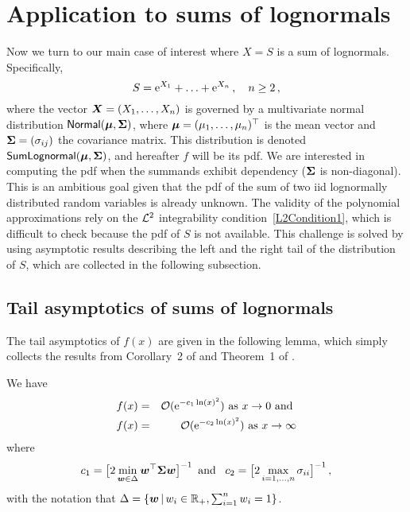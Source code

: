 \section{Application to sums of lognormals} \label{S:LN_Appl}
Now we turn to our main case of interest where $X=S$ is a sum of lognormals. Specifically,
\begin{equation}\label{7.12a}
S=\mathrm{e}^{X_1}+\ldots+\mathrm{e}^{X_n} \,,\quad n \ge 2\,,
\end{equation}
where the vector $\bm{X}=(X_1,\ldots,X_n)$ is governed by a multivariate normal distribution $\mathsf{Normal}(\bm{\mu}, \bm{\Sigma})$, where $\bm{\mu}=(\mu_{1},\ldots,\mu_{n})^\top$ is the mean vector and $\bm{\Sigma}=(\sigma_{ij})$ the covariance matrix.
This distribution is denoted $\mathsf{SumLognormal}(\bm{\mu}, \bm{\Sigma})$, and hereafter $f$ will be its pdf. We are interested in computing the pdf when the summands exhibit dependency ($\bm{\Sigma}$ is non-diagonal). This is an ambitious goal given that the pdf of the sum of two iid lognormally distributed random variables is already unknown. The validity of the polynomial approximations rely on the $\mathcal{L}^2$ integrability condition~\eqref{L2Condition1}, which is difficult to check because the pdf of $S$ is not available. This challenge is solved by using asymptotic results describing the left and the right tail of the distribution of $S$, which are collected in the following subsection.

\subsection{Tail asymptotics of sums of lognormals}\label{SS:LNSumsAsympt}

The tail asymptotics of $f(x)$ are given in the following lemma, which simply collects the results from Corollary~2 of \cite{tankov2015tail} and Theorem~1 of \cite{asmussen2008asymptotics}.

\begin{lemma} \label{le:SLNTails}
We have
\begin{eqnarray}
	f(x) &=&  {\mathcal{O}} ( \mathrm{e}^{-c_1 \ln(x)^2} ) \text{ as }x\to 0 \text{ and } \label{SLNLeftTail} \\
	f(x) &=& {\mathcal{O}} ( \mathrm{e}^{-c_2 \ln(x)^2} ) \text{ as }x\to \infty \label{SLNRightTail}
\end{eqnarray}
where
\[
	c_1 = \bigl[ 2 \min_{\bm{w} \in \Delta} \bm{w}^\top \bm{\Sigma} \bm{w} \bigr]^{-1} \, \text{ and } \,\,\, c_2 = \bigl[ 2 \max_{i=1,\dots,n} \sigma_{ii} \bigr]^{-1}  \,,
\]
with the notation that $\Delta = \{ \bm{w} \,|\, w_i \in \mathbb{R}_+, \sum_{i=1}^n w_i = 1 \}$.
\end{lemma}

